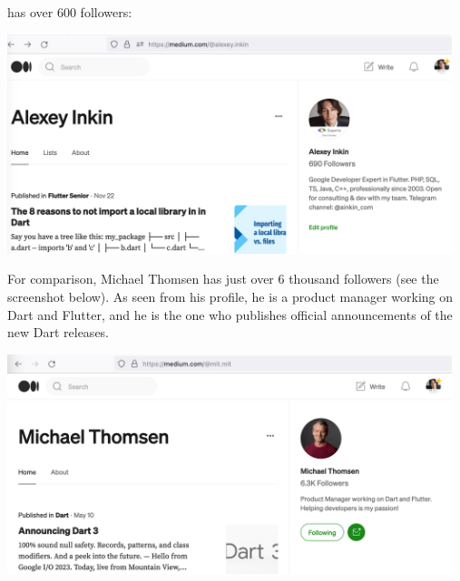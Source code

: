 
\mrl has over 600 followers:
\begin{center}
    \includegraphics[width=35em]{inkin-followers}
\end{center}

For comparison, Michael Thomsen has just over 6 thousand followers (see the screenshot below).
As seen from his profile, he is a product manager working on Dart and Flutter,
and he is the one who publishes official announcements of the new Dart releases.

\begin{center}
    \includegraphics[width=35em]{thomsen-followers-p1}
\end{center}
\WillContinue
\pagebreak

